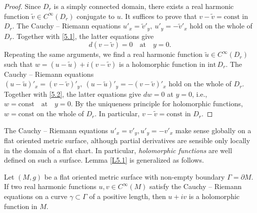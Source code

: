 \documentclass[12pt,reqno]{amsart}
\begin{document}
\begin{proof}
Since $D_r$ is a simply connected domain, there exists a real harmonic function $\widetilde v\in C^\infty(D_r)$ conjugate to $u$. It suffices to prove that
$v-\widetilde v=\mbox{const}$ in $D_r$. The Cauchy -- Riemann equations
$
u'_x={\widetilde v}'_y,\ u'_y=-{\widetilde v}'_x
$
hold on the whole of $D_r$. Together with \eqref{5.1}, the latter equations give
\begin{equation}
d(v-\tilde v)=0\quad\mbox{at}\quad y=0.
                                \label{5.2}
\end{equation}
Repeating the same arguments, we find a real harmonic function $\widetilde u\in C^\infty(D_r)$ such that  $w=(u-\widetilde u)+i(v-\widetilde v)$ is a holomorphic function in $\mbox{int}\,D_r$. The Cauchy -- Riemann equations
$
(u-\widetilde u)'_x=(v-\widetilde v)'_y,\ (u-\widetilde u)'_y=-(v-\widetilde v)'_x
$
hold on the whole of $D_r$. Together with \eqref{5.2}, the latter equations give $dw=0$ at $y=0$, i.e.,
$
w=\mbox{const}\quad\mbox{at}\quad y=0.
$
By the uniqueness principle for holomorphic functions, $w=\mbox{const}$ on the whole of $D_r$. In particular,
$v-\widetilde v=\mbox{const}$ in $D_r$.
\end{proof}

The Cauchy -- Riemann equations $u'_x=v'_y, u'_y=-v'_x$ make sense globally on a flat oriented metric surface, although partial derivatives are sensible only locally in the domain of a flat chart. In particular, {\it holomorphic functions} are well defined on such a surface. Lemma \ref{L5.1} is generalized as follows.

\begin{lemma} \label{L5.2}
Let $(M,g)$ be a flat oriented metric surface with non-empty boundary $\Gamma=\partial M$. If two real harmonic functions
$u,v\in C^\infty(M)$ satisfy the Cauchy -- Riemann equations on a curve $\gamma\subset\Gamma$ of a positive length, then $u+iv$ is a holomorphic function in $M$.
\end{lemma}
\end{document}
